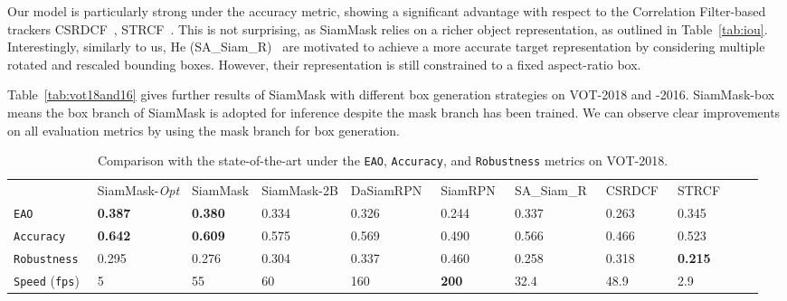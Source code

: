 \documentclass[10pt,twocolumn,letterpaper]{article}
\newcommand{\bd}[1]{\textbf{#1}}
\newcommand{\tablestyle}[2]{\setlength{\tabcolsep}{#1}\renewcommand{\arraystretch}{#2}\centering\footnotesize}
\begin{document}
Our model is particularly strong under the accuracy metric, showing a significant advantage with respect to the Correlation Filter-based trackers CSRDCF~\cite{lukezic2017discriminative}, STRCF~\cite{li2018learning}.
This is not surprising, as SiamMask relies on a richer object representation, as outlined in Table~\ref{tab:iou}.
Interestingly, similarly to us, He \etal (SA\_Siam\_R)~\cite{he2018towards} are motivated to achieve a more accurate target representation by considering multiple rotated and rescaled bounding boxes.
However, their representation is still constrained to a fixed aspect-ratio box.

Table~\ref{tab:vot18and16} gives further results of SiamMask with different box generation strategies on VOT-2018 and -2016.
SiamMask-box means the box branch of SiamMask is adopted for inference despite the mask branch has been trained. We can observe clear improvements on all evaluation metrics by using the mask branch for box generation.


\begin{table*}[t]
\tablestyle{2pt}{1}
\begin{tabular}{l|x{52}x{42}x{48}|x{52}x{52}x{52}x{42}x{42}x{42}x{42}}
& SiamMask-\textit{Opt} & SiamMask & SiamMask-2B & DaSiamRPN~\cite{zhu2018distractor} & SiamRPN~\cite{SiamRPN} & SA\_Siam\_R~\cite{he2018towards}
 &CSRDCF~\cite{lukezic2017discriminative}  &STRCF~\cite{li2018learning} \\
\shline
\texttt{EAO  }& \bd{0.387} & \bd{0.380} &  0.334 & 0.326 & 0.244 & 0.337 & 0.263  & 0.345 \\
\texttt{Accuracy }& \bd{0.642} & \bd{0.609} & 0.575 & 0.569 & 0.490 & 0.566 & 0.466  & 0.523 \\
\texttt{Robustness }& 0.295 & 0.276 &  0.304 & 0.337 &  0.460 & 0.258& 0.318  & \bd{0.215}   \\
\hline
\texttt{Speed} (\texttt{fps})  & 5 & 55  & 60  &160   &\bd{200}   &32.4  & 48.9    & 2.9 \\
\end{tabular}
\vspace{1mm}
\caption{Comparison with the state-of-the-art under the \texttt{EAO}, \texttt{Accuracy}, and \texttt{Robustness} metrics on VOT-2018.}
\label{tab:vot18}
\end{table*}
\end{document}
